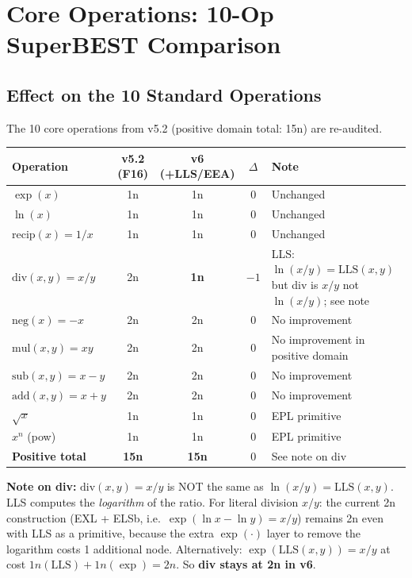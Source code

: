 \documentclass[11pt]{article}
\newcommand{\imp}[1]{\textcolor{improved}{\textbf{#1}}}
\newcommand{\sam}[1]{\textcolor{same}{#1}}
\begin{document}
\section{Core Operations: 10-Op SuperBEST Comparison}
\label{sec:core}

\subsection{Effect on the 10 Standard Operations}

The 10 core operations from v5.2 (positive domain total: 15n) are re-audited.

\begin{center}
\begin{tabular}{lcccl}
\toprule
Operation & v5.2 (F16) & v6 (+LLS/EEA) & $\Delta$ & Note \\
\midrule
$\exp(x)$        & 1n & \sam{1n} & 0 & Unchanged \\
$\ln(x)$         & 1n & \sam{1n} & 0 & Unchanged \\
$\mathrm{recip}(x) = 1/x$ & 1n & \sam{1n} & 0 & Unchanged \\
$\mathrm{div}(x,y) = x/y$ & 2n & \imp{1n} & $-1$ & LLS: $\ln(x/y)=\mathrm{LLS}(x,y)$ but div is $x/y$ not $\ln(x/y)$; see note \\
$\mathrm{neg}(x) = -x$ & 2n & \sam{2n} & 0 & No improvement \\
$\mathrm{mul}(x,y) = xy$ & 2n & \sam{2n} & 0 & No improvement in positive domain \\
$\mathrm{sub}(x,y) = x-y$ & 2n & \sam{2n} & 0 & No improvement \\
$\mathrm{add}(x,y) = x+y$ & 2n & \sam{2n} & 0 & No improvement \\
$\sqrt{x}$       & 1n & \sam{1n} & 0 & EPL primitive \\
$x^n$ (pow)     & 1n & \sam{1n} & 0 & EPL primitive \\
\midrule
\textbf{Positive total} & \textbf{15n} & \textbf{15n} & $0$ & See note on div \\
\bottomrule
\end{tabular}
\end{center}

\noindent \textbf{Note on div:} $\mathrm{div}(x,y) = x/y$ is NOT the same as
$\ln(x/y) = \mathrm{LLS}(x,y)$. LLS computes the \emph{logarithm} of the ratio.
For literal division $x/y$: the current 2n construction
(EXL + ELSb, i.e.\ $\exp(\ln x - \ln y) = x/y$) remains 2n even with LLS as a primitive,
because the extra $\exp(\cdot)$ layer to remove the logarithm costs 1 additional node.
Alternatively: $\exp(\mathrm{LLS}(x,y)) = x/y$ at cost $1n(\mathrm{LLS}) + 1n(\exp) = 2n$.
So \textbf{div stays at 2n in v6}.
\end{document}

